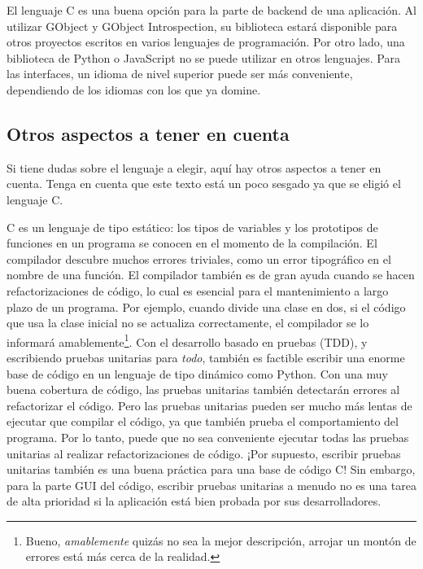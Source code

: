 El lenguaje C es una buena opción para la parte de backend de una aplicación. Al utilizar GObject y GObject Introspection, su biblioteca estará disponible para otros proyectos escritos en varios lenguajes de programación. Por otro lado, una biblioteca de Python o JavaScript no se puede utilizar en otros lenguajes. Para las interfaces, un idioma de nivel superior puede ser más conveniente, dependiendo de los idiomas con los que ya domine.

\subsection{Otros aspectos a tener en cuenta}
Si tiene dudas sobre el lenguaje a elegir, aquí hay otros aspectos a tener en cuenta. Tenga en cuenta que este texto está un poco sesgado ya que se eligió el lenguaje C.

C es un lenguaje de tipo estático: los tipos de variables y los prototipos de funciones en un programa se conocen en el momento de la compilación. El compilador descubre muchos errores triviales, como un error tipográfico en el nombre de una función. El compilador también es de gran ayuda cuando se hacen refactorizaciones de código, lo cual es esencial para el mantenimiento a largo plazo de un programa. Por ejemplo, cuando divide una clase en dos, si el código que usa la clase inicial no se actualiza correctamente, el compilador se lo informará amablemente\footnote{Bueno, \emph{amablemente} quizás no sea la mejor descripción, arrojar un montón de errores está más cerca de la realidad.}. Con el desarrollo basado en pruebas (TDD), y escribiendo pruebas unitarias para \emph{todo}, también es factible escribir una enorme base de código en un lenguaje de tipo dinámico como Python. Con una muy buena cobertura de código, las pruebas unitarias también detectarán errores al refactorizar el código. Pero las pruebas unitarias pueden ser mucho más lentas de ejecutar que compilar el código, ya que también prueba el comportamiento del programa. Por lo tanto, puede que no sea conveniente ejecutar todas las pruebas unitarias al realizar refactorizaciones de código. ¡Por supuesto, escribir pruebas unitarias también es una buena práctica para una base de código C! Sin embargo, para la parte GUI del código, escribir pruebas unitarias a menudo no es una tarea de alta prioridad si la aplicación está bien probada por sus desarrolladores.

